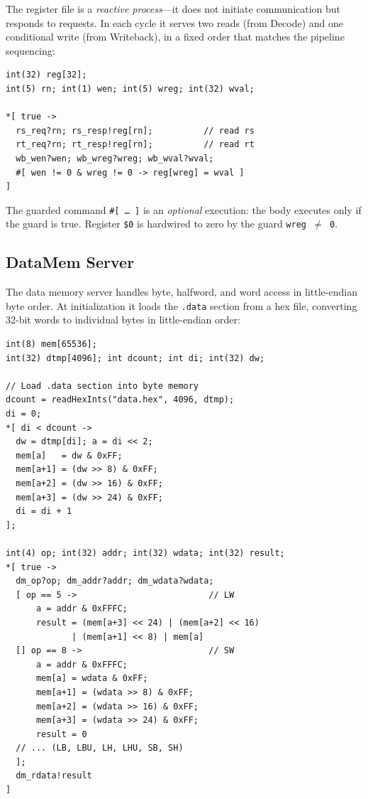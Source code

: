 \documentclass[11pt]{article}
\begin{document}
The register file is a \emph{reactive process}---it does not initiate
communication but responds to requests.  In each cycle it serves two reads
(from Decode) and one conditional write (from Writeback), in a fixed order
that matches the pipeline sequencing:

\begin{lstlisting}[style=csp,caption={Register file server}]
int(32) reg[32];
int(5) rn; int(1) wen; int(5) wreg; int(32) wval;

*[ true ->
  rs_req?rn; rs_resp!reg[rn];          // read rs
  rt_req?rn; rt_resp!reg[rn];          // read rt
  wb_wen?wen; wb_wreg?wreg; wb_wval?wval;
  #[ wen != 0 & wreg != 0 -> reg[wreg] = wval ]
]
\end{lstlisting}

The guarded command \texttt{\#[~\ldots~]} is an \emph{optional} execution:
the body executes only if the guard is true.  Register \texttt{\$0} is
hardwired to zero by the guard \texttt{wreg~$\neq$~0}.

\subsection{DataMem Server}

The data memory server handles byte, halfword, and word access in
little-endian byte order.  At initialization it loads the \texttt{.data}
section from a hex file, converting 32-bit words to individual bytes in
little-endian order:

\begin{lstlisting}[style=csp,caption={Data memory server (initialization and selected operations)}]
int(8) mem[65536];
int(32) dtmp[4096]; int dcount; int di; int(32) dw;

// Load .data section into byte memory
dcount = readHexInts("data.hex", 4096, dtmp);
di = 0;
*[ di < dcount ->
  dw = dtmp[di]; a = di << 2;
  mem[a]   = dw & 0xFF;
  mem[a+1] = (dw >> 8) & 0xFF;
  mem[a+2] = (dw >> 16) & 0xFF;
  mem[a+3] = (dw >> 24) & 0xFF;
  di = di + 1
];

int(4) op; int(32) addr; int(32) wdata; int(32) result;
*[ true ->
  dm_op?op; dm_addr?addr; dm_wdata?wdata;
  [ op == 5 ->                          // LW
      a = addr & 0xFFFC;
      result = (mem[a+3] << 24) | (mem[a+2] << 16)
             | (mem[a+1] << 8) | mem[a]
  [] op == 8 ->                         // SW
      a = addr & 0xFFFC;
      mem[a] = wdata & 0xFF;
      mem[a+1] = (wdata >> 8) & 0xFF;
      mem[a+2] = (wdata >> 16) & 0xFF;
      mem[a+3] = (wdata >> 24) & 0xFF;
      result = 0
  // ... (LB, LBU, LH, LHU, SB, SH)
  ];
  dm_rdata!result
]
\end{lstlisting}
\end{document}
